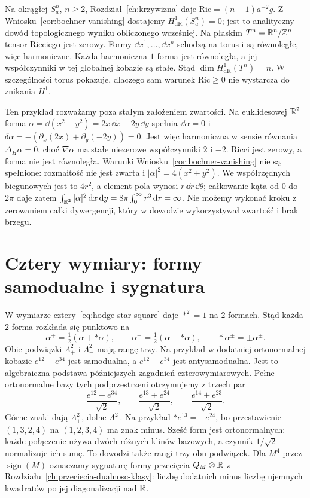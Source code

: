 \begin{przyklad}
Na okrągłej $S_a^n$, $n\geq2$, Rozdział~\ref{ch:krzywizna}
daje $\mathrm{Ric}=(n-1)a^{-2}g$.
Z Wniosku~\ref{cor:bochner-vanishing} dostajemy
$H^1_{\mathrm{dR}}(S_a^n)=0$; jest to analityczny
dowód topologicznego wyniku obliczonego wcześniej.
Na płaskim $T^n=\mathbb{R}^n/\mathbb{Z}^n$ tensor Ricciego jest
zerowy. Formy $\dd x^1,\ldots,\dd x^n$ schodzą na torus
i są równoległe, więc harmoniczne. Każda harmoniczna
$1$-forma jest równoległa, a jej współczynniki w tej
globalnej kobazie są stałe. Stąd
$\dim H^1_{\mathrm{dR}}(T^n)=n$.
W szczególności torus pokazuje, dlaczego sam warunek
$\mathrm{Ric}\geq0$ nie wystarcza do znikania $H^1$.
\end{przyklad}

\begin{przyklad}
\label{prz:bochner-niezwarta-18}
Ten przykład rozważamy poza stałym założeniem zwartości.
Na euklidesowej $\mathbb{R}^2$ forma
$\alpha=\dd(x^2-y^2)=2x\,\dd x-2y\,\dd y$
spełnia $\dd\alpha=0$ i
$\delta\alpha=-(\partial_x(2x)+\partial_y(-2y))=0$.
Jest więc harmoniczna w sensie równania $\Delta_H\alpha=0$,
choć $\nabla\alpha$ ma stałe niezerowe współczynniki $2$ i $-2$.
Ricci jest zerowy, a forma nie jest równoległa.
Warunki Wniosku~\ref{cor:bochner-vanishing} nie są spełnione:
rozmaitość nie jest zwarta i
$|\alpha|^2=4(x^2+y^2)$. We współrzędnych biegunowych
jest to $4r^2$, a element pola wynosi $r\,\dd r\,\dd\theta$;
całkowanie kąta od $0$ do $2\pi$ daje zatem
$\int_{\mathbb{R}^2}|\alpha|^2\,\mathrm d x\,\mathrm d y
=8\pi\int_0^\infty r^3\,\mathrm d r=\infty$.
Nie możemy wykonać kroku z zerowaniem całki dywergencji,
który w dowodzie wykorzystywał zwartość i brak brzegu.
\end{przyklad}

\section{Cztery wymiary: formy samodualne i sygnatura}
\label{sec:hodge-four-manifolds}

W wymiarze cztery~\eqref{eq:hodge-star-square} daje
$*^2=1$ na $2$-formach. Stąd każda $2$-forma rozkłada się
punktowo na
\[
 \alpha^+=\tfrac12(\alpha+*\alpha),\qquad
 \alpha^-=\tfrac12(\alpha-*\alpha),\qquad
 *\alpha^\pm=\pm\alpha^\pm.
\]
Obie podwiązki $\Lambda^2_+$ i $\Lambda^2_-$ mają rangę
trzy. Na przykład w dodatniej ortonormalnej kobazie
$e^{12}+e^{34}$ jest samodualna, a $e^{12}-e^{34}$
jest antysamodualna. Jest to algebraiczna podstawa
późniejszych zagadnień czterowymiarowych.
Pełne ortonormalne bazy tych podprzestrzeni otrzymujemy
z trzech par
\[
 \frac{e^{12}\pm e^{34}}{\sqrt2},\qquad
 \frac{e^{13}\mp e^{24}}{\sqrt2},\qquad
 \frac{e^{14}\pm e^{23}}{\sqrt2}.
\]
Górne znaki dają $\Lambda^2_+$, dolne $\Lambda^2_-$.
Na przykład $*e^{13}=-e^{24}$, bo przestawienie
$(1,3,2,4)$ na $(1,2,3,4)$ ma znak minus.
Sześć form jest ortonormalnych: każde połączenie
używa dwóch różnych klinów bazowych, a czynnik $1/\sqrt2$
normalizuje ich sumę. To dowodzi także rangi trzy obu podwiązek.
Dla $M^4$ przez $\operatorname{sign}(M)$ oznaczamy sygnaturę formy
przecięcia $Q_M\otimes\mathbb{R}$ z
Rozdziału~\ref{ch:przeciecia-dualnosc-klasy}: liczbę
dodatnich minus liczbę ujemnych kwadratów po jej
diagonalizacji nad $\mathbb{R}$.

